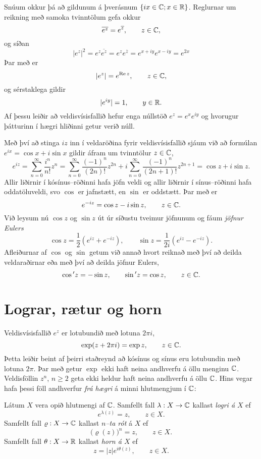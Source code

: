 Snúum okkur þá að gildunum á  þverásnum ${\{ix\in {\mathbb C};
 x\in {\mathbb R}\}}$. Reglurnar um reikning með samoka tvinntölum gefa
okkur
$$\overline{e^z}=e^{\overline z},\qquad z\in {\mathbb C},
$$
og síðan
 $$|e^z|^2=e^z\overline{e^{z}}=e^ze^{\overline z}=e^{x+iy}e^{x-iy}=e^{2x}
 $$
Þar með er
 $$|e^z|=e^{{\operatorname{Re\, }} z}, \qquad z\in {\mathbb C},
 $$
og sérstaklega gildir 
$$
|e^{iy}|=1, \qquad y\in {\mathbb R}.
$$
Af þessu leiðir  að veldisvísisfallið hefur enga
núllstöð
$e^z=e^xe^{iy}$ og  hvorugur þátturinn í hægri hliðinni getur verið
núll.  

Með því að stinga $iz$ inn í veldaröðina fyrir veldis\-vísis\-fallið
sjáum við að formúlan $e^{ix}=\cos x+i\sin x$ gildir áfram um 
tvinntölur $z\in{\mathbb C}$,
 $$
e^{iz}=\sum\limits_{n=0}^\infty\dfrac{i^n}{n!}z^n
=\sum\limits_{n=0}^\infty\dfrac{(-1)^n}{(2n)!}z^{2n}
+i\sum\limits_{n=0}^\infty\dfrac{(-1)^n}{(2n+1)!}z^{2n+1}
=\cos z +i \sin z.
 $$
Allir liðirnir í kósínus--röðinni hafa jöfn veldi og allir liðirnir í
sínus--röðinni hafa oddatöluveldi, svo $\cos$ er jafnstætt, en
$\sin$ er oddstætt.  Þar með er
 $$e^{-iz}=\cos z-i\sin z, \qquad z\in {\mathbb C}.
 $$
Við leysum nú $\cos z$ og $\sin z$ út úr síðustu tveimur
jöfnunum og fáum {\it jöfnur
Eulers}
 $$\cos z =\frac 12(e^{iz}+e^{-iz}), \qquad
\sin z =\frac 1{2i}(e^{iz}-e^{-iz}).
 $$
Afleiðurnar af $\cos$ og $\sin$ getum við annað hvort reiknað með því
að deilda veldaraðirnar eða með því að deilda jöfnur Eulers,
 $$\cos{\sp{\prime}} z=-\sin z, \qquad \sin{\sp{\prime}} z=\cos z, \qquad z\in {\mathbb C}.
 $$


\section{Lograr, rætur og horn}


\noindent
Veldisvísisfallið $e^z$ er lotubundið með lotuna $2\pi i$,
$$
\exp(z+2{\pi}i) = \exp z, \qquad z\in {\mathbb C}.
$$
Þetta leiðir beint af þeirri staðreynd að kósínus og sínus eru
lotubundin með lotuna $2{\pi}$.
Þar með getur $\exp$ ekki haft neina andhverfu á öllu menginu ${\mathbb C}$.  
Veldisföllin 
$z^n$, $n\geq 2$ geta ekki heldur haft neina andhverfu á öllu ${\mathbb C}$.
Hins vegar hafa þessi föll andhverfur {\it frá hægri } 
á minni hlutmengjum í ${\mathbb C}$:

\begin{sk}
Látum $X$ vera opið hlutmengi af ${\mathbb C}$.  Samfellt fall $\lambda:X\to
{\mathbb C}$ kallast  {\it logri á $X$} ef
 \begin{equation*}e^{\lambda(z)}=z, \qquad z\in X.
\label{4.6.1}
 \end{equation*}
Samfellt fall $\varrho:X\to {\mathbb C}$ kallast {\it $n$--ta
rót} á $X$ ef
 \begin{equation*}\big(\varrho(z)\big)^n=z, \qquad z\in X.
\label{4.6.2}
 \end{equation*}
Samfellt fall $\theta:X\to {\mathbb R}$ kallast {\it horn á $X$} ef 
 \begin{equation*}z=|z|e^{i\theta(z)}, \qquad z\in X.
\label{4.6.3}
 \end{equation*}
\end{sk}


